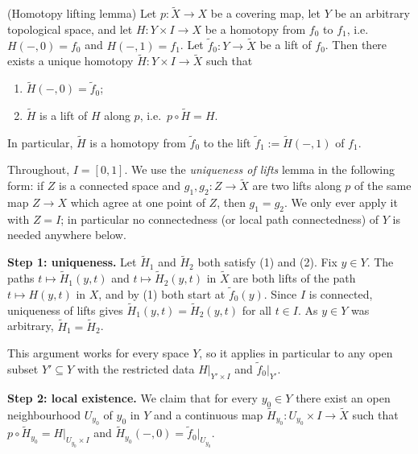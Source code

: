 \documentclass{article}
\begin{document}
\begin{lemma}
	(Homotopy lifting lemma) Let $ p:\tilde X \to X $ be a covering map, let $ Y $ be an arbitrary topological space, and let $ H: Y\times I \to X $ be a homotopy from $ f_0 $ to $ f_1 $, i.e.\ $ H(-,0)=f_0 $ and $ H(-,1)=f_1 $. Let $ \tilde f_0 : Y \to \tilde X $ be a lift of $ f_0 $. Then there exists a unique homotopy $ \tilde H : Y \times I \to \tilde X $ such that
	\begin{enumerate}
		\item $ \tilde H(-,0) = \tilde f_0 $;
		\item $ \tilde H $ is a lift of $ H $ along $ p $, i.e.\ $ p\circ\tilde H = H $.
	\end{enumerate}
	In particular, $ \tilde H $ is a homotopy from $ \tilde f_0 $ to the lift $ \tilde f_1 := \tilde H(-,1) $ of $ f_1 $.
\end{lemma}
\pf Throughout, $ I=[0,1] $. We use the \emph{uniqueness of lifts} lemma in the following form: if $ Z $ is a connected space and $ g_1,g_2:Z\to\tilde X $ are two lifts along $ p $ of the same map $ Z\to X $ which agree at one point of $ Z $, then $ g_1=g_2 $. We only ever apply it with $ Z=I $; in particular no connectedness (or local path connectedness) of $ Y $ is needed anywhere below.
\par
\textbf{Step 1: uniqueness.} Let $ \tilde H_1 $ and $ \tilde H_2 $ both satisfy (1) and (2). Fix $ y\in Y $. The paths $ t\mapsto \tilde H_1(y,t) $ and $ t\mapsto \tilde H_2(y,t) $ in $ \tilde X $ are both lifts of the path $ t\mapsto H(y,t) $ in $ X $, and by (1) both start at $ \tilde f_0(y) $. Since $ I $ is connected, uniqueness of lifts gives $ \tilde H_1(y,t)=\tilde H_2(y,t) $ for all $ t\in I $. As $ y\in Y $ was arbitrary, $ \tilde H_1=\tilde H_2 $.
\par
This argument works for every space $ Y $, so it applies in particular to any open subset $ Y'\subseteq Y $ with the restricted data $ H|_{Y'\times I} $ and $ \tilde f_0|_{Y'} $.
\par
\textbf{Step 2: local existence.} We claim that for every $ y_0\in Y $ there exist an open neighbourhood $ U_{y_0} $ of $ y_0 $ in $ Y $ and a continuous map $ \tilde H_{y_0}:U_{y_0}\times I\to\tilde X $ such that $ p\circ\tilde H_{y_0}=H|_{U_{y_0}\times I} $ and $ \tilde H_{y_0}(-,0)=\tilde f_0|_{U_{y_0}} $.
\par
\end{document}
